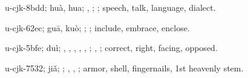 \begin{multicols}{2}
{\cjkgGlue{}u-cjk-8bdd; huà, hua; \cjkgGlue{}\cjkgGlue{}\cjkgGlue{}, \cjkgGlue{}; \cjkgGlue{}; speech, talk, language, dialect.

\cjkgGlue{}u-cjk-62ec; guā, kuò; \cjkgGlue{}\cjkgGlue{}\cjkgGlue{}; \cjkgGlue{}; include, embrace, enclose.

\cjkgGlue{}u-cjk-5bfe; duì; \cjkgGlue{}, \cjkgGlue{}\cjkgGlue{}\cjkgGlue{}, \cjkgGlue{}\cjkgGlue{}\cjkgGlue{}, \cjkgGlue{}\cjkgGlue{}\cjkgGlue{}, \cjkgGlue{}\cjkgGlue{}\cjkgGlue{}, \cjkgGlue{}\cjkgGlue{}\cjkgGlue{}; \cjkgGlue{}, \cjkgGlue{}; correct, right, facing, opposed.

\cjkgGlue{}u-cjk-7532; jiǎ; \cjkgGlue{}; \cjkgGlue{}, \cjkgGlue{}, \cjkgGlue{}; armor, shell, fingernails, 1st heavenly stem.

}
\end{multicols}
